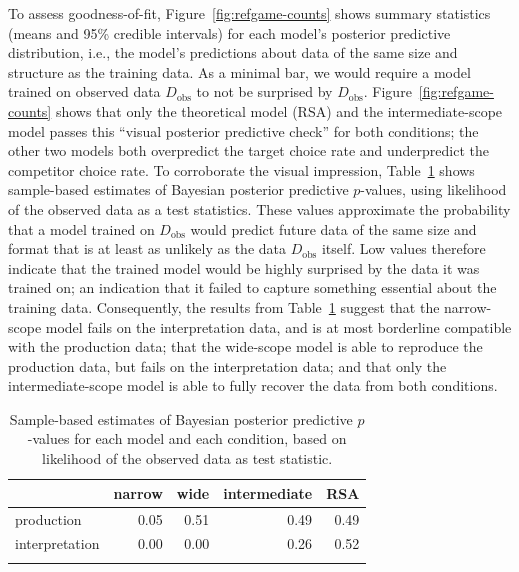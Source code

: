 \documentclass[fleqn]{article}
\begin{document}
To assess goodness-of-fit, Figure~\ref{fig:refgame-counts} shows summary statistics (means and 95\% credible intervals) for each model's posterior predictive distribution, i.e., the model's predictions about data of the same size and structure as the training data.
As a minimal bar, we would require a model trained on observed data $D_{\text{obs}}$ to not be surprised by $D_{\text{obs}}$.
Figure~\ref{fig:refgame-counts} shows that only the theoretical model (RSA) and the intermediate-scope model passes this ``visual posterior predictive check'' for both conditions; the other two models both overpredict the target choice rate and underpredict the competitor choice rate.
To corroborate the visual impression, Table~\ref{tab:Bppp-values} shows sample-based estimates of Bayesian posterior predictive $p$-values, using likelihood of the observed data as a test statistics.
These values approximate the probability that a model trained on $D_{\text{obs}}$ would predict future data of the same size and format that is at least as unlikely as the data $D_{\text{obs}}$ itself.
Low values therefore indicate that the trained model would be highly surprised by the data it was trained on; an indication that it failed to capture something essential about the training data.
Consequently, the results from Table~\ref{tab:Bppp-values} suggest that the narrow-scope model fails on the interpretation data, and is at most borderline compatible with the production data; that the wide-scope model is able to reproduce the production data, but fails on the interpretation data; and that only the intermediate-scope model is able to fully recover the data from both conditions.

\begin{table}[ht]
\centering


\begin{tabular}{lrrrr}
  \toprule
  & narrow & wide & intermediate & RSA \\ \midrule
  production & 0.05 & 0.51 & 0.49 & 0.49 \\
  interpretation & 0.00 & 0.00 & 0.26 & 0.52 \\ \bottomrule \\
\end{tabular}


\caption{Sample-based estimates of Bayesian posterior predictive $p$-values for each model and each condition, based on likelihood of the observed data as test statistic.}
\label{tab:Bppp-values}
\end{table}
\end{document}
